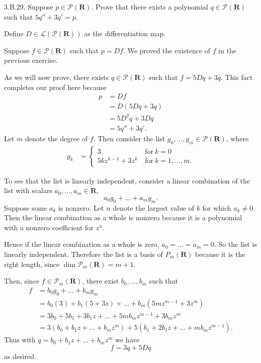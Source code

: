 \documentclass[a5paper]{article}
\begin{document}
\newcommand   \C           {\mathbf{C}}
\newcommand   \R           {\mathbf{R}}
\renewcommand \L           {\mathcal{L}}
\newcommand   \F           {\mathbf{F}}
\renewcommand \P           {\mathcal{P}}
\newcommand   \M           {\mathcal{M}}
\newcommand   \op          {\operatorname}

    3.B.29.
    Suppose $p \in \P(\R)$.
    Prove that there exists a polynomial $q \in \P(\R)$ such that $5q'' + 3q' = p$.


    Define $D \in \L(\P(\R))$ as the differentiation map.

    Suppose $f \in \P(\R)$ such that $p = Df$.
    We proved the existence of $f$ in the previous exercise.

    As we will now prove, there exists $q \in \P(\R)$ such that $f = 5Dq + 3q$.
    This fact completes our proof here because
\begin{align*}
        p &= Df \\
          &= D(5Dq + 3q) \\
          &= 5D^2q + 3Dq \\
          &= 5q'' + 3q' .
\end{align*}
    Let $m$ denote the degree of $f$.
    Then consider the list $g_0,\dots,g_m \in \P(\R)$, where
\begin{align*}
        g_k &=
        \begin{cases}
            3                \ &\text{for}\ k = 0 \\
            5kz^{k-1} + 3z^k \ &\text{for}\ k = 1,\dots,m .
        \end{cases}
\end{align*}

    To see that the list is linearly independent, consider a linear combination of the list with scalars $a_0,\dots,a_m \in \R$,
\begin{equation*}
        a_0g_0 + \dots + a_mg_m .
\end{equation*}
    Suppose some $a_k$ is nonzero.
    Let $n$ denote the largest value of $k$ for which $a_k \neq 0$.
    Then the linear combination as a whole is nonzero because it is a polynomial with a nonzero coefficient for $z^n$.
    
    Hence if the linear combination as a whole is zero, $a_0=\dots=a_m=0$.
    So the list is linearly independent.
    Therefore the list is a basis of $P_m(\R)$ because it is the right length, since $\op{dim}\P_m(\R) = m+1$.

    Then, since $f \in \P_m(\R)$, there exist $b_0,\dots,b_m$ such that
\begin{align*}
        f &= b_0g_0 + \dots + b_mg_m \\
          &= b_0(3) + b_1(5+3z) + \dots + b_m(5mz^{m-1} + 3z^m) \\
          &= 3b_0 + 5b_1 + 3b_1z + \dots + 5mb_mz^{m-1} + 3b_mz^m \\
          &= 3(b_0 + b_1z + \dots + b_mz^m) + 5(b_1 + 2b_1z + \dots + mb_mz^{m-1}) .
\end{align*}
    Thus with $q = b_0 + b_1z + \dots + b_mz^m$ we have
\begin{equation*}
        f = 3q + 5Dq
\end{equation*}
    as desired.
\end{document}
